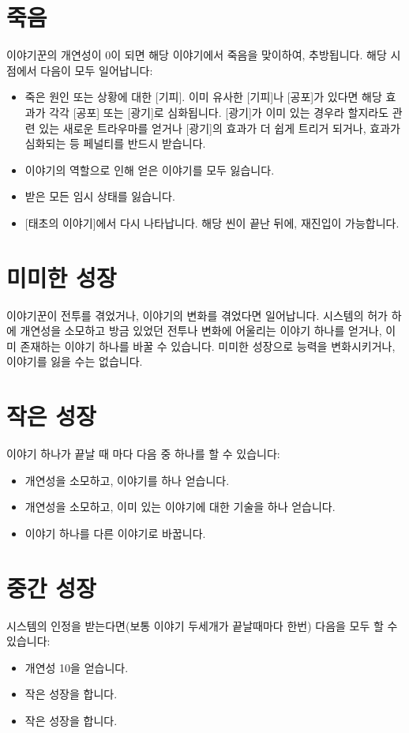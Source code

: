 \documentclass[12pt]{report}
\begin{document}
	\section*{죽음}
	이야기꾼의 개연성이 0이 되면 해당 이야기에서 죽음을 맞이하여, 추방됩니다. 해당 시점에서 다음이 모두 일어납니다:
	\begin{itemize}
		\item 죽은 원인 또는 상황에 대한 [기피]. 이미 유사한 [기피]나 [공포]가 있다면 해당 효과가 각각 [공포] 또는 [광기]로 심화됩니다. [광기]가 이미 있는 경우라 할지라도 관련 있는 새로운 트라우마를 얻거나 [광기]의 효과가 더 쉽게 트리거 되거나, 효과가 심화되는 등 페널티를 반드시 받습니다.
		\item 이야기의 역할으로 인해 얻은 이야기를 모두 잃습니다.
		\item 받은 모든 임시 상태를 잃습니다.
		\item {}[태초의 이야기]에서 다시 나타납니다. 해당 씬이 끝난 뒤에, 재진입이 가능합니다.
	\end{itemize}
	
	\section*{미미한 성장}
	이야기꾼이 전투를 겪었거나, 이야기의 변화를 겪었다면 일어납니다. 시스템의 허가 하에 개연성을 소모하고 방금 있었던 전투나 변화에 어울리는 이야기 하나를 얻거나, 이미 존재하는 이야기 하나를 바꿀 수 있습니다. 미미한 성장으로 능력을 변화시키거나, 이야기를 잃을 수는 없습니다.
	
	\section*{작은 성장}
	이야기 하나가 끝날 때 마다 다음 중 하나를 할 수 있습니다:
	\begin{itemize}
		\item 개연성을 소모하고, 이야기를 하나 얻습니다.
		\item 개연성을 소모하고, 이미 있는 이야기에 대한 기술을 하나 얻습니다.
		\item 이야기 하나를 다른 이야기로 바꿉니다.
	\end{itemize}
	
	\section*{중간 성장}
	시스템의 인정을 받는다면(보통 이야기 두세개가 끝날때마다 한번) 다음을 모두 할 수 있습니다:
	\begin{itemize}
		\item 개연성 10을 얻습니다.
		\item 작은 성장을 합니다.
		\item 작은 성장을 합니다.
	\end{itemize}
	
\end{document}
